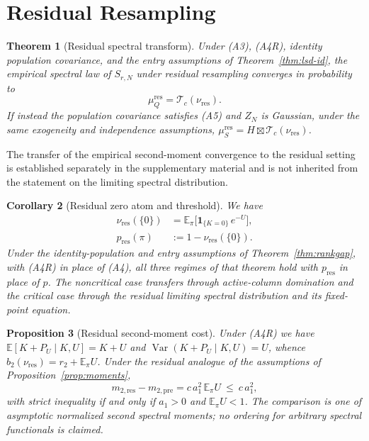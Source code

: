 \documentclass[lettersize,journal]{IEEEtran}
\newtheorem{theo}{Theorem}
\newtheorem{prop}[theo]{Proposition}
\newtheorem{coro}[theo]{Corollary}
\theoremstyle{remark}
\begin{document}
\section{Residual Resampling}
\label{sec:res}

\begin{theo}[Residual spectral transform]
\label{thm:res-lsd}
Under (A3), (A4R), identity population covariance, and the entry assumptions
of Theorem~\ref{thm:lsd-id}, the empirical spectral law of $S_{r,N}$ under
residual resampling converges in probability to
\begin{equation}
  \mu_Q^{\mathrm{res}} = \mathcal{T}_c(\nu_{\mathrm{res}}).
  \label{eq:res-lsd}
\end{equation}
If instead the population covariance satisfies (A5) and $Z_N$ is Gaussian,
under the same exogeneity and independence assumptions,
$\mu_S^{\mathrm{res}}=H\boxtimes\mathcal{T}_c(\nu_{\mathrm{res}})$.
\end{theo}

The transfer of the empirical second-moment convergence to the residual
setting is established separately in the supplementary material and is not
inherited from the statement on the limiting spectral distribution.

\begin{coro}[Residual zero atom and threshold]
\label{coro:res-atom}
We have
\begin{equation}
  \begin{aligned}
    \nu_{\mathrm{res}}(\{0\})
      &= \mathbb{E}_\pi\big[\mathbf{1}_{\{K=0\}}\,e^{-U}\big],\\
    p_{\mathrm{res}}(\pi) &:= 1-\nu_{\mathrm{res}}(\{0\}).
  \end{aligned}
  \label{eq:res-atom}
\end{equation}
Under the identity-population and entry assumptions of
Theorem~\ref{thm:rankgap}, with (A4R) in place of (A4), all three regimes of
that theorem hold with $p_{\mathrm{res}}$ in place of $p$. The noncritical
case transfers through active-column domination and the critical case through
the residual limiting spectral distribution and its fixed-point equation.
\end{coro}

\begin{prop}[Residual second-moment cost]
\label{prop:res-cost}
Under (A4R) we have $\mathbb{E}[K+P_U\mid K,U]=K+U$ and
$\operatorname{Var}(K+P_U\mid K,U)=U$, whence
$b_2(\nu_{\mathrm{res}})=r_2+\mathbb{E}_\pi U$. Under the residual analogue of
the assumptions of Proposition~\ref{prop:moments},
\begin{equation}
  m_{2,\mathrm{res}}-m_{2,\mathrm{pre}}
    = c\,a_1^2\,\mathbb{E}_\pi U\ \le\ c\,a_1^2,
  \label{eq:res-cost}
\end{equation}
with strict inequality if and only if $a_1>0$ and $\mathbb{E}_\pi U<1$. The
comparison is one of asymptotic normalized second spectral moments; no
ordering for arbitrary spectral functionals is claimed.
\end{prop}
\end{document}
